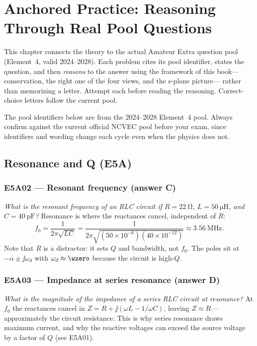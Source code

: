 \chapter{Anchored Practice: Reasoning Through Real Pool Questions}
\label{ch:practice}
This chapter connects the theory to the actual Amateur Extra question pool
(Element~4, valid 2024--2028). Each problem cites its pool identifier, states the
question, and then \emph{reasons} to the answer using the framework of this
book---conservation, the right one of the four views, and the s-plane picture---
rather than memorizing a letter. Attempt each before reading the reasoning.
Correct-choice letters follow the current pool.

\begin{exambox}
The pool identifiers below are from the 2024--2028 Element~4 pool. Always confirm
against the current official NCVEC pool before your exam, since identifiers and
wording change each cycle even when the physics does not.
\end{exambox}

\section{Resonance and Q (E5A)}

\subsection*{E5A02 --- Resonant frequency (answer C)}
\emph{What is the resonant frequency of an RLC circuit if \(R=\SI{22}{\ohm}\),
\(L=\SI{50}{\micro\henry}\), and \(C=\SI{40}{\pico\farad}\)?}
Resonance is where the reactances cancel, independent of \(R\):
\[
f_0=\frac{1}{2\pi\sqrt{LC}}
=\frac{1}{2\pi\sqrt{(50\times10^{-6})(40\times10^{-12})}}
\approx\SI{3.56}{\mega\hertz}.
\]
Note that \(R\) is a distractor: it sets \(Q\) and bandwidth, not \(f_0\). The
poles sit at \(-\alpha\pm\jj\omega_d\) with \(\omega_d\approx\wzero\) because the
circuit is high-\(Q\).

\subsection*{E5A03 --- Impedance at series resonance (answer D)}
\emph{What is the magnitude of the impedance of a series RLC circuit at
resonance?} At \(f_0\) the reactances cancel in \(Z=R+\jj(\omega L-1/\omega C)\),
leaving \(Z\approx R\)---approximately the circuit resistance. This is why series
resonance draws maximum current, and why the reactive voltages can exceed the
source voltage by a factor of \(Q\) (see E5A01).

